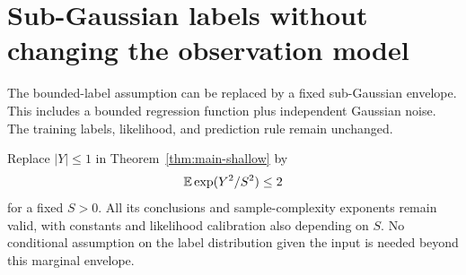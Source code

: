 \section{Sub-Gaussian labels without changing the observation model}
\label{sec:subgaussian-labels}
The bounded-label assumption can be replaced by a fixed sub-Gaussian envelope. This includes a bounded regression function plus independent Gaussian noise. The training labels, likelihood, and prediction rule remain unchanged.

\begin{corollary}
\label{cor:subgaussian-labels}
Replace $|Y|\le1$ in Theorem~\ref{thm:main-shallow} by
\[
 \mathbb E\exp(Y^2/S^2)\le2
\]
for a fixed $S>0$. All its conclusions and sample-complexity exponents remain valid, with constants and likelihood calibration also depending on $S$. No conditional assumption on the label distribution given the input is needed beyond this marginal envelope.
\end{corollary}

